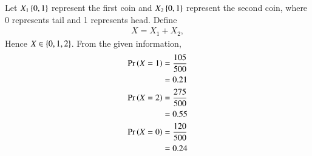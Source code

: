 Let $X_1\left\{0,1\right\}$ represent the first coin and $X_2\left\{0,1\right\}$ represent the second coin, where 0 represents tail and 1 represents head.  Define 
\begin{align}
X = X_1 + X_2,
\end{align}
Hence $X \in \left\{0,1,2\right\}$.  From the given information, 
\begin{align}
\Pr\left(X=1\right) &= \frac{105}{500}
\\
&= 0.21
\\
\Pr\left(X=2\right) &= \frac{275}{500}
\\
&= 0.55
\\
\Pr\left(X=0\right) &= \frac{120}{500}
\\
&= 0.24
\end{align}
